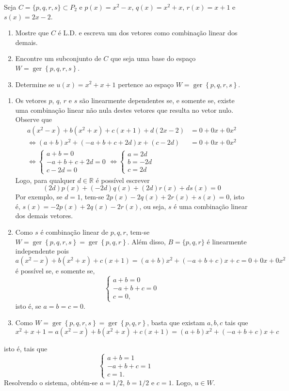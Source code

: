 \documentclass[12pt,a4paper]{article}
\newcommand*\ger[1]{\operatorname{ger}\left\{#1\right\}}
\newcommand*\R{\mathbb{R}}
\begin{document}
\begin{ExerciseList}
\Exercise[title={2,5}] Seja $C = \{ p, q, r, s \} \subset P_2$ e $p(x) = x^2 - x$, $q(x) = x^2 + x$, $r(x) = x + 1$ e $s(x) = 2x - 2$.
\begin{enumerate}
\item Mostre que $C$ é L.D. e escreva um dos vetores como combinação linear dos demais.
\item Encontre um subconjunto de $C$ que seja uma base do espaço $W = \ger{p,q,r,s}$.
\item Determine se $u(x) = x^2 + x + 1$ pertence ao espaço $W = \ger{p,q,r,s}$.
\end{enumerate}
\Answer
\begin{enumerate}
\item Os vetores $p$, $q$, $r$ e $s$ são linearmente dependentes se, e somente se, existe uma combinação linear não nula destes vetores que resulta no vetor nulo. Observe que
\begin{align*}
a(x^2 - x) +b(x^2 + x) + c(x + 1) + d(2x - 2)
&= 0 + 0x + 0x^2 \\
\Leftrightarrow
(a+b)x^2 + (-a+b+c+2d)x + (c-2d)
& = 0 + 0x + 0x^2 \\
\Leftrightarrow
\begin{cases}
 a+b      = 0\\
-a+b+c+2d = 0\\
     c-2d = 0
\end{cases}
\Leftrightarrow
\begin{cases}
a =  2d\\
b = -2d\\
c =  2d
\end{cases}
\end{align*}
Logo, para qualquer $d \in \R$ é possível escrever
\[
(2d) p(x) + (-2d) q(x) + (2d) r(x) + d s(x) = 0
\]
Por exemplo, se $d=1$, tem-se $2p(x) - 2q(x) + 2r(x) + s(x) = 0$, isto é, $s(x) = -2p(x) + 2q(x) - 2r(x)$, ou seja, $s$ é uma combinação linear dos demais vetores.

\item Como $s$ é combinação linear de $p,q,r$, tem-se $W = \ger{p,q,r,s} = \ger{p,q,r}$. Além disso, $B = \{ p, q, r \}$ é linearmente independente pois
\[
a(x^2 - x) +b(x^2 + x) + c(x + 1)
= (a+b)x^2 + (-a+b+c)x + c
= 0 + 0x + 0x^2
\]
é possível se, e somente se,
\[
\begin{cases}
 a+b   = 0\\
-a+b+c = 0\\
     c = 0,
\end{cases}
\]
isto é, se $a=b=c=0$.

\item Como $W = \ger{p,q,r,s} = \ger{p,q,r}$, basta que existam $a,b,c$ tais que
\[
x^2 + x + 1
= a(x^2 - x) +b(x^2 + x) + c(x + 1)
= (a+b)x^2 + (-a+b+c)x + c
\]
\end{enumerate}
isto é, tais que
\[
\begin{cases}
 a+b   = 1\\
-a+b+c = 1\\
     c = 1.
\end{cases}
\]
Resolvendo o sistema, obtém-se $a=1/2$, $b=1/2$ e $c=1$. Logo, $u \in W$.
\end{ExerciseList}
\end{document}
